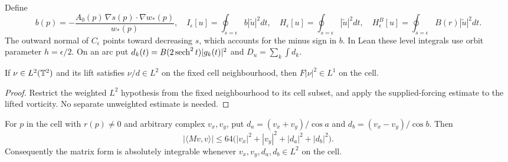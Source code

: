 \begin{definition}
\label{def:dd-ground-current}
\leanok
Define
\[
 b(p)=-\frac{A_0(p)\,\nabla s(p)\cdot\nabla w_*(p)}{w_*(p)},\quad
 I_\epsilon[u]=\oint_{s=\epsilon}b|\widetilde u|^2dt,\quad
 H_\epsilon[u]=\oint_{s=\epsilon}|\widetilde u|^2dt,\quad
 H^B_\epsilon[u]=\oint_{s=\epsilon}B(r)|\widetilde u|^2dt.
\]
The outward normal of $C_\epsilon$ points toward decreasing $s$, which
accounts for the minus sign in $b$. In Lean these level integrals use
orbit parameter $h=\epsilon/2$. On an arc put
$d_k(t)=B(2\operatorname{sech}^2t)|g_k(t)|^2$ and $D_u=\sum_k\int d_k$.
\end{definition}

\begin{lemma}
\label{lem:dd-vorticity-density-integrable}
\leanok
If $\nu\in L^2(\mathbb{T}^2)$ and its lift satisfies $\nu/d\in L^2$ on the
fixed cell neighbourhood, then $F|\nu|^2\in L^1$ on the cell.
\end{lemma}

\begin{proof}
\leanok
Restrict the weighted $L^2$ hypothesis from the fixed neighbourhood to
its cell subset, and apply the supplied-forcing estimate to the lifted
vorticity. No separate unweighted estimate is needed.
\end{proof}

\begin{lemma}
\label{lem:dd-diagonal-matrix-bound}
\leanok
For $p$ in the cell with $r(p)\ne0$ and arbitrary complex $v_x,v_y$, put
$d_a=(v_x+v_y)/\cos a$ and $d_b=(v_x-v_y)/\cos b$. Then
\[
 |\langle Mv,v\rangle|
 \le64\bigl(|v_x|^2+|v_y|^2+|d_a|^2+|d_b|^2\bigr).
\]
Consequently the matrix form is absolutely integrable whenever
$v_x,v_y,d_a,d_b\in L^2$ on the cell.
\end{lemma}

